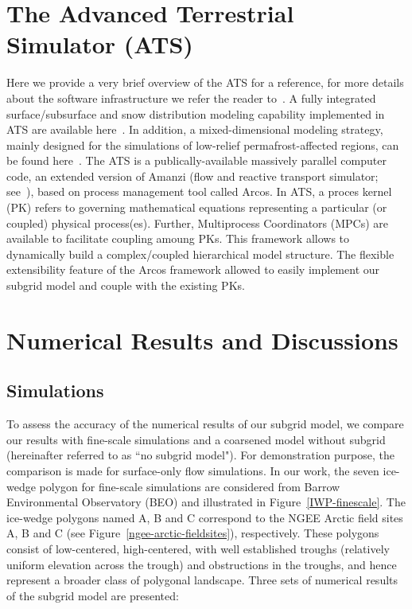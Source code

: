 \documentclass[review,11pt]{elsarticle}
\begin{document}
\section{The Advanced Terrestrial Simulator (ATS)}\label{ATS}
Here we provide a very brief overview of the ATS for a reference, for more details about the software infrastructure we refer the reader to~\cite{ecoon2016managing, ats-website}. A fully integrated surface/subsurface and snow distribution modeling capability implemented in ATS are available here~\cite{spainter2016integrated, atchley2015}. In addition, a mixed-dimensional modeling strategy, mainly designed for the simulations of low-relief permafrost-affected regions, can be found here~\cite{jan2017}. The ATS is a publically-available massively parallel computer code, an extended version of Amanzi (flow and reactive transport simulator; see~\cite{moulton2012high}), based on process management tool called Arcos. In ATS, a proces kernel (PK) refers to governing mathematical equations representing a particular (or coupled) physical process(es). Further, Multiprocess Coordinators (MPCs) are available to facilitate coupling amoung PKs. This framework allows to dynamically build a complex/coupled hierarchical model structure. The flexible extensibility feature of the Arcos framework allowed to easily implement our subgrid model and couple with the existing PKs.

\section{Numerical Results and Discussions}\label{numerical-tests}
\FloatBarrier
\subsection{Simulations}
To assess the accuracy of the numerical results of our subgrid model, we compare our results with fine-scale simulations and a coarsened model without subgrid (hereinafter referred to as ``no subgrid model"). For demonstration purpose, the comparison is made for surface-only flow simulations. In our work, the seven ice-wedge polygon for fine-scale simulations are considered from Barrow Environmental Observatory (BEO) and illustrated in Figure~\ref{IWP-finescale}. The ice-wedge polygons named A, B and C correspond to the NGEE Arctic field sites A, B and C (see Figure~\ref{ngee-arctic-fieldsites}), respectively. These polygons consist of low-centered, high-centered, with well established troughs (relatively uniform elevation across the trough) and obstructions in the troughs, and hence represent a broader class of polygonal landscape. Three sets of numerical results of the subgrid model are presented:
\end{document}
